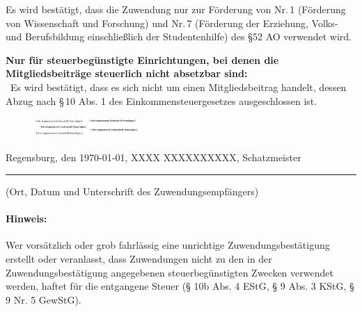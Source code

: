 \documentclass[11pt,ngerman]{scrartcl}
\newcommand{\unmychecked}{\scalebox{1.5}{\Square}}
\begin{document}
\begin{mdframed}[style=MyFormStyle]%
\footnotesize Es wird bestätigt, dass die Zuwendung nur zur Förderung von Nr.\,1 (Förderung von Wissenschaft und Forschung) und  Nr.\,7 (Förderung der Erziehung, Volks- und Berufsbildung einschließlich der Studentenhilfe) des §52 AO verwendet wird. \vspace{0.5em}

\textbf{Nur für steuerbegünstigte Einrichtungen, bei denen die Mitgliedsbeiträge steuerlich nicht absetzbar sind:} \\
\unmychecked\, Es wird bestätigt, dass es sich nicht um einen Mitgliedsbeitrag handelt, dessen Abzug nach §\,10 Abs. 1 des Einkommensteuergesetzes ausgeschlossen ist. 

\end{mdframed} 


\vspace*{0.5em} 


\begin{figure}[h!]   
\includegraphics[width=150px]{unterschrift_schatzmeister.jpg}
\label{fig:schatzi}
\end{figure}

Regensburg, den \today  , XXXX XXXXXXXXXX, Schatzmeister

\hrule

\vspace*{0.5em} (Ort, Datum und Unterschrift des Zuwendungsempfängers) 

\paragraph{Hinweis:} Wer vorsätzlich oder grob fahrlässig eine unrichtige Zuwendungsbestätigung erstellt oder veranlasst, dass 
Zuwendungen nicht zu den in der Zuwendungsbestätigung angegebenen steuerbegünstigten Zwecken verwendet 
werden, haftet für die entgangene Steuer (§ 10b Abs. 4 EStG, § 9 Abs. 3 KStG, § 9 Nr. 5 GewStG). 
\end{document}
